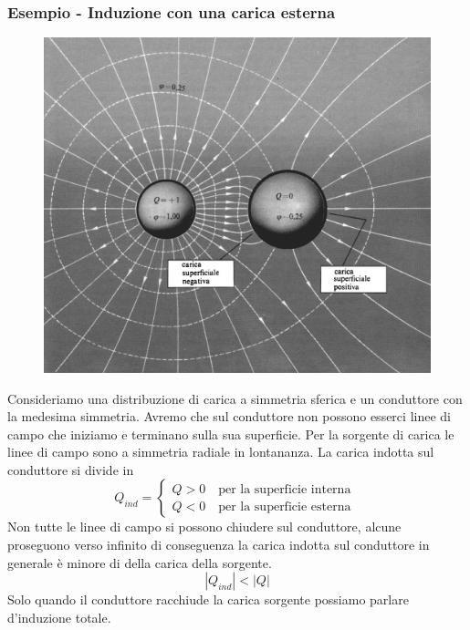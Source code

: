  \newpage
 
 \subsubsection{Esempio - Induzione con una carica esterna}
 
\begin{figure}[!ht]
\vspace{0.1in}
\includegraphics[scale = 0.35]{images/conductor}	
\centering
\vspace{0.1in}
\end{figure}

 Consideriamo una distribuzione di carica a simmetria sferica e un conduttore con la medesima simmetria.
 Avremo che  sul conduttore non possono esserci linee di campo che iniziamo e terminano sulla sua superficie. Per la sorgente di carica le linee di campo sono a simmetria radiale in lontananza. La carica indotta sul conduttore si divide in
 \begin{equation*}
 	Q_{ind} = \left \{ \begin{array}{l}
 		Q > 0 \quad \text{per la superficie interna}\\
 		Q< 0 \quad \text{per la superficie esterna }
 	\end{array}\right.
 \end{equation*}
 Non tutte le linee di campo si possono chiudere sul conduttore, alcune proseguono verso infinito di conseguenza la carica indotta sul conduttore in generale \`e minore di della carica della sorgente.
 \begin{equation*}
 	|Q_{ind}| < |Q|
 \end{equation*}
 Solo quando il conduttore racchiude la carica sorgente possiamo parlare d'induzione totale. 
 \newpage
 
